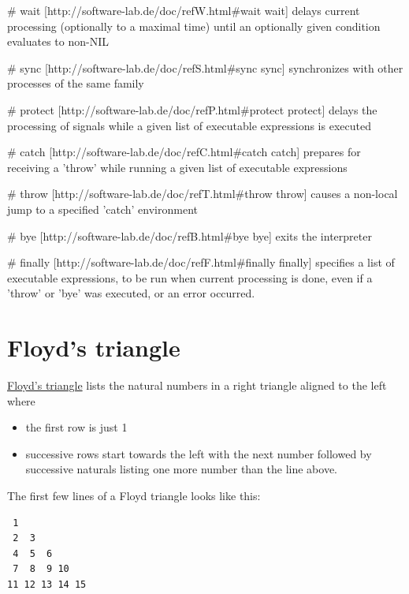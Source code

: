 \begin{wideverbatim}

# wait
[http://software-lab.de/doc/refW.html#wait wait] delays current processing
(optionally to a maximal time) until an optionally given condition
evaluates to non-NIL

# sync
[http://software-lab.de/doc/refS.html#sync sync] synchronizes with other
processes of the same family

# protect
[http://software-lab.de/doc/refP.html#protect protect] delays the processing
of signals while a given list of executable expressions is executed

# catch
[http://software-lab.de/doc/refC.html#catch catch] prepares for receiving a
'throw' while running a given list of executable expressions

# throw
[http://software-lab.de/doc/refT.html#throw throw] causes a non-local jump
to a specified 'catch' environment

# bye
[http://software-lab.de/doc/refB.html#bye bye] exits the interpreter

# finally
[http://software-lab.de/doc/refF.html#finally finally] specifies a list of
executable expressions, to be run when current processing is done, even if
a 'throw' or 'bye' was executed, or an error occurred.

\end{wideverbatim}

\pagebreak{}
\section*{Floyd's triangle}

\href{http://en.wikipedia.org/wiki/Floyd\%27s\_triangle}{Floyd's
triangle} lists the natural numbers in a right triangle aligned to the
left where

\begin{itemize}
\item
  the first row is just 1
\item
  successive rows start towards the left with the next number followed
  by successive naturals listing one more number than the line above.
\end{itemize}

The first few lines of a Floyd triangle looks like this:

\begin{verbatim}
 1
 2  3
 4  5  6
 7  8  9 10
11 12 13 14 15
\end{verbatim}

